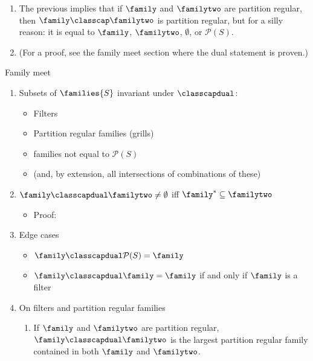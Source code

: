 \begin{enumerate}
\begin{enumerate}
        \item The previous implies that if $\family$ and $\familytwo$ are partition regular, then $\family \classcap \familytwo$ is partition regular, but for a silly reason: it is equal to $\family$, $\familytwo$, $\emptyset$, or $\mathcal{P}(S)$.

        \item (For a proof, see the family meet section where the dual statement is proven.)
    \end{enumerate}
\end{enumerate}

Family meet
\begin{enumerate}
    \item Subsets of $\families{S}$ invariant under $\classcapdual$:
    \begin{itemize}
        \item Filters
        \item Partition regular families (grills)
        \item families not equal to $\mathcal{P}(S)$
        \item (and, by extension, all intersections of combinations of these)
    \end{itemize}
    
    \item $\family \classcapdual \familytwo \neq \emptyset$ iff $\family^* \subseteq \familytwo$ 
    \begin{itemize}
        \item Proof:
    \end{itemize}
    
    \item Edge cases
    \begin{itemize}
        \item $\family \classcapdual \mathcal{P}(S) = \family$ 
        \item $\family \classcapdual \family = \family$ if and only if $\family$ is a filter
    \end{itemize}
    \item On filters and partition regular families
    \begin{enumerate}
        \item If $\family$ and $\familytwo$ are partition regular, $\family \classcapdual \familytwo$ is the largest partition regular family contained in both $\family$ and $\familytwo$.
        

\end{enumerate}
\end{enumerate}
